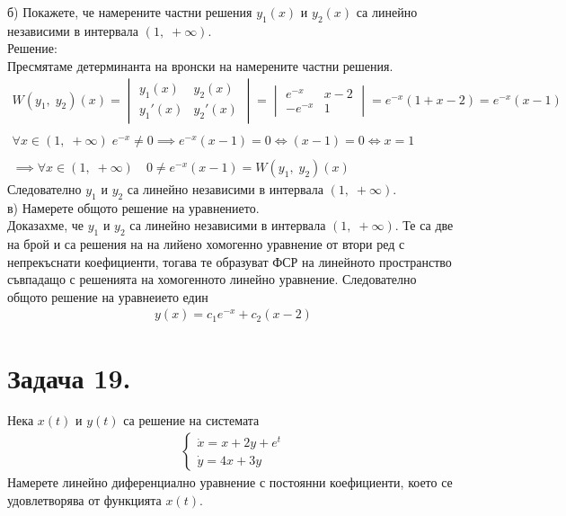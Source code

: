 \documentclass[a4paper, 12pt, oneside]{article}
\begin{document}
б) Покажете, че намерените частни решения $y_1(x)$ и $y_2(x)$
са линейно независими в интервала $(1, \; +\infty)$. \\

Решение: \\

Пресмятаме детерминанта на вронски на намерените частни решения.
\begin{align*}
    W(y_1, \; y_2)(x) = \begin{vmatrix}
        y_1(x) & y_2(x) \\
        y_1'(x) & y_2'(x)
    \end{vmatrix} = \begin{vmatrix}
        e^{-x}& x - 2 \\
        -e^{-x} & 1
    \end{vmatrix} = e^{-x}(1 + x - 2) = e^{-x}(x - 1) \\\\
    \forall x \in (1, \; +\infty) \; e^{-x} \neq 0 \implies e^{-x}(x - 1) = 0 \iff (x - 1) = 0 \iff x = 1 \\\\
    \implies \forall x \in (1, \; +\infty) \quad 0 \neq e^{-x}(x - 1) = W(y_1, \; y_2)(x)
\end{align*}
Следователно $y_1$ и $y_2$ са линейно независими в интервала $(1, \; +\infty)$. \\

в) Намерете общото решение на уравнението. \\

Доказахме, че $y_1$ и $y_2$ са линейно независими в интервала $(1, \; +\infty)$.
Те са две на брой и са решения на на лийено хомогенно уравнение от втори ред с
непрекъснати коефициенти, тогава те образуват ФСР на линейното пространство съвпадащо
с решенията на хомогенното линейно уравнение. Следователно общото решение на уравнеието един
\begin{align*}
    y(x) = c_1e^{-x} + c_2(x - 2)
\end{align*}

\section{Задача 19.}
Нека $x(t)$ и $y(t)$ са решение на системата
\begin{align*}
    \begin{cases}
        \dot{x} = x + 2y + e^t \\
        \dot{y} = 4x + 3y
    \end{cases}
\end{align*}
Намерете линейно диференциално уравнение с постоянни коефициенти,
което се удовлетворява от функцията $x(t)$. \\
\end{document}
